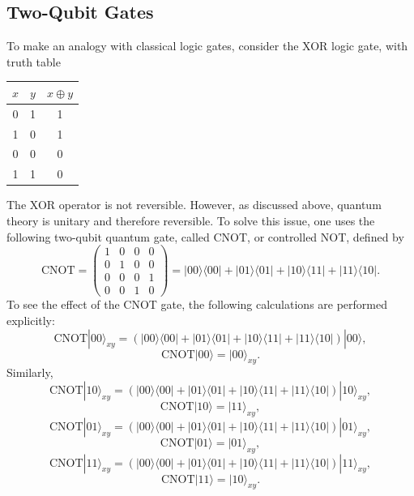 \documentclass[a4paper]{article}
\begin{document}
\subsection{Two-Qubit Gates}
To make an analogy with classical logic gates, consider the XOR logic gate, with truth table
\begin{center}
\begin{tabular}{ |c|c|c| }
 \hline
 $x$ & $y$ & $x\oplus y$ \\ \hline
 0   & 1   &   1\\
 1   & 0   &   1\\
 0   & 0   &   0\\
 1   & 1   &   0\\
 \hline
\end{tabular}
\end{center}
The XOR operator is not reversible. However, as discussed above, quantum theory is unitary and therefore reversible. To solve this issue, one uses the following two-qubit quantum gate, called CNOT, or controlled NOT, defined by
\begin{equation}
\text{CNOT}=
	\begin{pmatrix}
		1 & 0 & 0 & 0 \\
		0 & 1 & 0 & 0 \\
		0 & 0 & 0 & 1 \\
		0 & 0 & 1 & 0
	\end{pmatrix}=|00\rangle\langle 00|+|01\rangle\langle 01|+|10\rangle\langle 11|+|11\rangle\langle 10|.
\end{equation}
To see the effect of the CNOT gate, the following calculations are performed explicitly:
\begin{equation}
\text{CNOT}|00\rangle_{xy}=(|00\rangle\langle 00|+|01\rangle\langle 01|+|10\rangle\langle 11|+|11\rangle\langle 10|)|00\rangle,
\end{equation}
\begin{equation*}
\text{CNOT}|00\rangle=|00\rangle_{xy}.
\end{equation*}
Similarly,
\begin{equation}
\text{CNOT}|10\rangle_{xy}=(|00\rangle\langle 00|+|01\rangle\langle 01|+|10\rangle\langle 11|+|11\rangle\langle 10|)|10\rangle_{xy},
\end{equation}
\begin{equation*}
\text{CNOT}|10\rangle=|11\rangle_{xy},
\end{equation*}
\begin{equation}
\text{CNOT}|01\rangle_{xy}=(|00\rangle\langle 00|+|01\rangle\langle 01|+|10\rangle\langle 11|+|11\rangle\langle 10|)|01\rangle_{xy},
\end{equation}
\begin{equation*}
\text{CNOT}|01\rangle=|01\rangle_{xy},
\end{equation*}
\begin{equation}
\text{CNOT}|11\rangle_{xy}=(|00\rangle\langle 00|+|01\rangle\langle 01|+|10\rangle\langle 11|+|11\rangle\langle 10|)|11\rangle_{xy},
\end{equation}
\begin{equation*}
\text{CNOT}|11\rangle=|10\rangle_{xy}.
\end{equation*}
\end{document}

